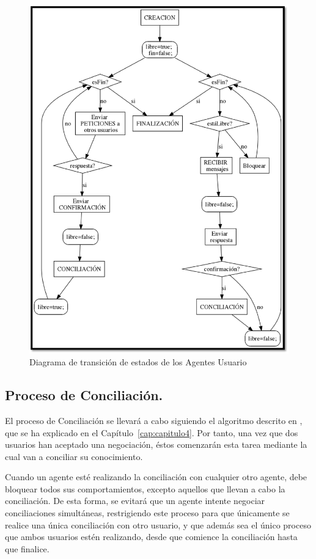 \begin{figure}[t]
\centering
\includegraphics[scale=0.35]{img/6/transicion}
\caption{Diagrama de transición de estados de los Agentes Usuario
\label{fig:transicion}}
\end{figure}


\subsection{Proceso de Conciliación.}

El proceso de Conciliación se llevará a cabo siguiendo el algoritmo descrito en \cite{algoritmo}, que se ha explicado en el Capítulo~\ref{cap:capitulo4}. Por tanto, una vez que dos usuarios han aceptado una negociación, éstos comenzarán esta tarea mediante la cual van a conciliar su conocimiento.

Cuando un agente esté realizando la conciliación con cualquier otro agente, debe bloquear todos sus comportamientos, excepto aquellos que llevan a cabo la conciliación. De esta forma, se evitará que un agente intente negociar conciliaciones simultáneas, restrigiendo este proceso para que únicamente se realice una única conciliación con otro usuario, y que además sea el único proceso que ambos usuarios estén realizando, desde que comience la conciliación hasta que finalice.

